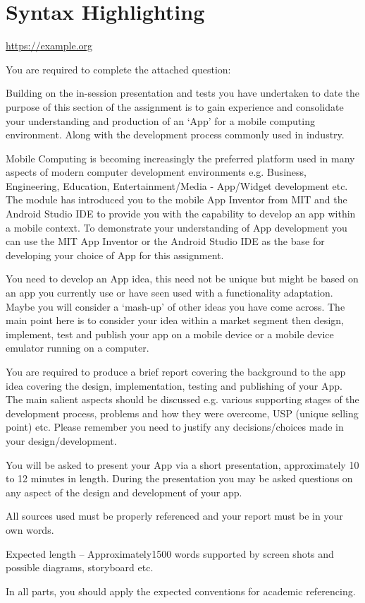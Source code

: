 \chapter{Syntax Highlighting}

\url{https://example.org}


You are required to complete the attached question:

Building on the in-session presentation and tests you have undertaken to date the purpose of this section of the assignment is to gain experience and consolidate your understanding and production of an ‘App’ for a mobile computing environment. Along with the development process commonly used in industry.

Mobile Computing is becoming increasingly the preferred platform used in many aspects of modern computer development environments e.g. Business, Engineering, Education, Entertainment/Media - App/Widget development etc. The module has introduced you to the mobile App Inventor from MIT and the Android Studio IDE to provide you with the capability to develop an app within a mobile context. To demonstrate your understanding of App development you can use the MIT App Inventor or the Android Studio IDE as the base for developing your choice of App for this assignment.

You need to develop an App idea, this need not be unique but might be based on an app you currently use or have seen used with a functionality adaptation.  Maybe you will consider a ‘mash-up’ of other ideas you have come across.  The main point here is to consider your idea within a market segment then design, implement, test and publish your app on a mobile device or a mobile device emulator running on a computer.

You are required to produce a brief report covering the background to the app idea covering the design, implementation, testing and publishing of your App.  The main salient aspects should be discussed e.g. various supporting stages of the development process, problems and how they were overcome, USP (unique selling point) etc. Please remember you need to justify any decisions/choices made in your design/development.

You will be asked to present your App via a short presentation, approximately 10 to 12 minutes in length.  During the presentation you may be asked questions on any aspect of the design and development of your app.

All sources used must be properly referenced and your report must be in your own words.

Expected length – Approximately1500 words supported by screen shots and possible diagrams, storyboard etc.

In all parts, you should apply the expected conventions for academic referencing.
